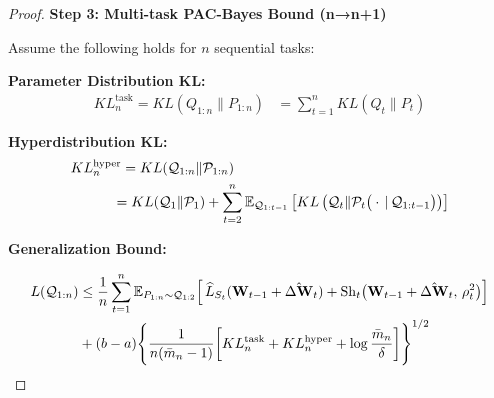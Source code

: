 \documentclass[letterpaper]{article} %
\begin{document}
\begin{proof}
\textbf{Step 3: Multi-task PAC-Bayes Bound (n→n+1)}

Assume the following holds for $n$ sequential tasks:


\textbf{Parameter Distribution KL:}
    \begin{align}
     KL^{\text{task}}_n=KL(Q_{1:n} \| P_{1:n}) 
    &= \sum_{t=1}^n KL(Q_t \| P_t)
    \end{align}

 
\textbf{Hyperdistribution KL:}
    \begin{align}
    &KL^{\text{hyper}}_n =KL(\mathcal{Q}_{1:n} \| \mathcal{P}_{1:n}) \notag \\
    & \quad  \qquad= KL(\mathcal{Q}_1 \| \mathcal{P}_1)  + \sum_{t=2}^n 
        \mathbb{E}_{\mathcal{Q}_{1:t-1}} \left[ 
            KL\left(\mathcal{Q}_t \| \mathcal{P}_t\big(\cdot\,|\,\mathcal{Q}_{1:t-1}\big)\right) 
        \right]
    \end{align}



\textbf{Generalization Bound:}



\begin{align}
 L(\mathcal{Q}_{1:n}) &\leq  \frac{1}{n} \sum_{t=1}^n 
    \mathbb{E}_{P_{1:n} \sim \mathcal{Q}_{1:2}} 
    \Big[\, 
        \widehat{L}_{S_t}(\mathbf{W}_{t-1} + \hat{\Delta\mathbf{W}}_t) 
    + \mathrm{Sh}_t\big(\mathbf{W}_{t-1} + \hat{\Delta\mathbf{W}}_t,\, \rho_t^2\big)
    \Big] \notag \\
&+ (b-a)\Bigg\{ \frac{1}{n(\bar{m}_n - 1)} \bigg[
            KL^{\text{task}}_n 
            + KL^{\text{hyper}}_n 
            +\log\frac{\bar{m}_n}{\delta}
        \bigg] \Bigg\}^{1/2}
\end{align}


\end{proof}
\end{document}
